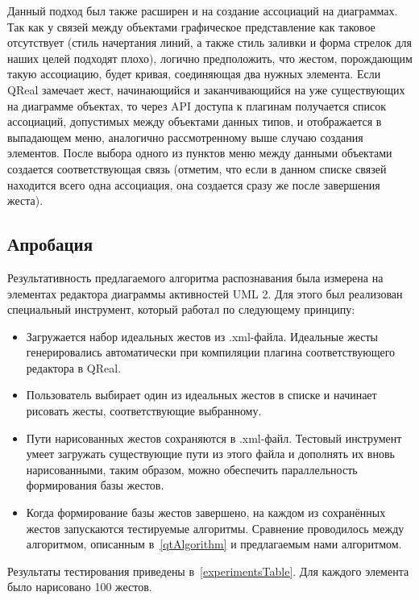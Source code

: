 \documentclass[a5paper]{article}
\begin{document}
Данный подход был также расширен и на создание ассоциаций на диаграммах. Так как у связей между объектами графическое представление как таковое отсутствует (стиль начертания линий, а также стиль заливки и форма стрелок для наших целей подходят плохо), логично 
предположить, что жестом, порождающим такую ассоциацию, будет кривая, соединяющая два нужных элемента. Если QReal замечает жест, начинающийся и заканчивающийся на уже существующих на диаграмме объектах, то через API доступа к плагинам получается список 
ассоциаций, допустимых между объектами данных типов, и отображается в выпадающем меню, аналогично рассмотренному выше случаю создания элементов. После выбора одного из пунктов меню между данными объектами создается соответствующая связь (отметим, что если в данном списке связей находится всего одна ассоциация, она создается сразу же после завершения жеста).

\subsection{Апробация}

Результативность предлагаемого алгоритма распознавания была измерена на элементах редактора диаграммы активностей UML 2. Для этого был реализован специальный инструмент, который работал по следующему принципу:
\begin{itemize}
  \item Загружается набор идеальных жестов из .xml-файла. Идеальные жесты генерировались автоматически при компиляции плагина соответствующего редактора в QReal.
  \item Пользователь выбирает один из идеальных жестов в списке и начинает рисовать жесты, соответствующие выбранному.
  \item Пути нарисованных жестов сохраняются в .xml-файл. Тестовый инструмент умеет загружать существующие пути из этого файла и дополнять их вновь нарисованными, таким образом, можно обеспечить параллельность формирования базы жестов.
  \item Когда формирование базы жестов завершено, на каждом из сохранённых жестов запускаются тестируемые алгоритмы. Сравнение проводилось между алгоритмом, описанным в~\ref{qtAlgorithm} и предлагаемым нами алгоритмом.
\end{itemize}

Результаты тестирования приведены в~\ref{experimentsTable}. Для каждого элемента было нарисовано 100 жестов.
\end{document}
